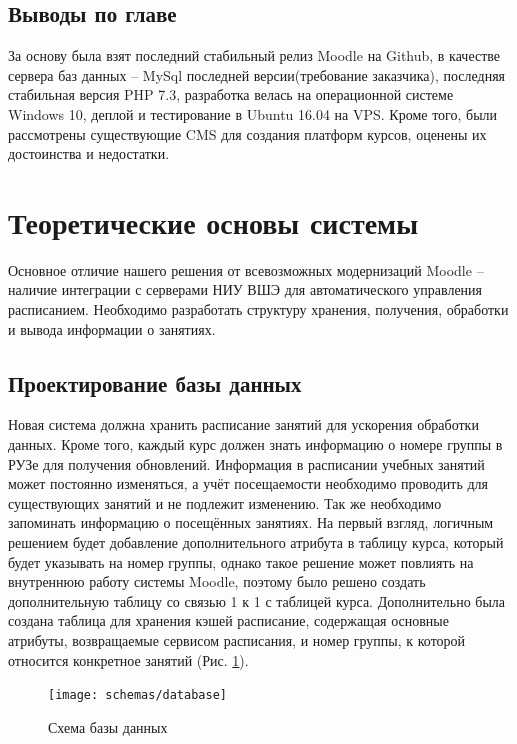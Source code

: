\documentclass[a4paper,14pt]{article}
\begin{document}
\subsection{Выводы по главе}

За основу была взят последний стабильный релиз Moodle на Github, в качестве сервера баз данных -- MySql последней версии(требование заказчика), последняя стабильная версия PHP 7.3, разработка велась на операционной системе Windows 10, деплой и тестирование в Ubuntu 16.04 на VPS. 
Кроме того, были рассмотрены существующие CMS для создания платформ курсов, оценены их достоинства и недостатки.


\section{Теоретические основы системы} 

Основное отличие нашего решения от всевозможных модернизаций Moodle -- наличие интеграции с серверами НИУ ВШЭ для автоматического управления расписанием.
Необходимо разработать структуру хранения, получения, обработки и вывода информации о занятиях.

\subsection{Проектирование базы данных}

Новая система должна хранить расписание занятий для ускорения обработки данных.
Кроме того, каждый курс должен знать информацию о номере группы в РУЗе для получения обновлений.
Информация в расписании учебных занятий может постоянно изменяться, а учёт посещаемости необходимо проводить для существующих занятий и не подлежит изменению.
Так же необходимо запоминать информацию о посещённых занятиях.
На первый взгляд, логичным решением будет добавление дополнительного атрибута в таблицу курса, который будет указывать на номер группы, однако такое решение может повлиять на внутреннюю работу системы Moodle, поэтому было решено создать дополнительную таблицу со связью 1 к 1 с таблицей курса.
Дополнительно была создана таблица для хранения кэшей расписание, содержащая основные атрибуты, возвращаемые сервисом расписания, и номер группы, к которой относится конкретное занятий (Рис. \ref{img:db_struct}).

\begin{figure}[H]
	\centering		
	\texttt{[image: schemas/database]}
	\caption{Схема базы данных}\label{img:db_struct}
\end{figure}
\end{document}
